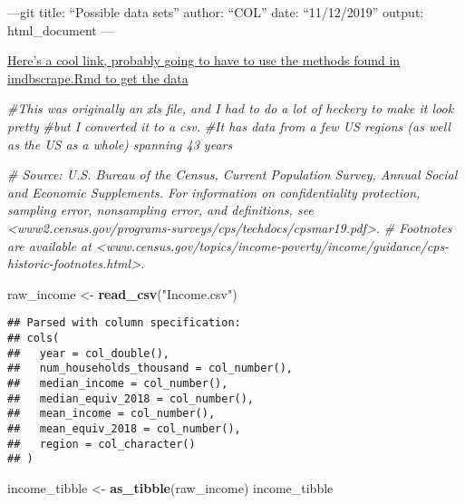 \documentclass[]{article}
\title{}
\author{}
\date{}
\newenvironment{Shaded}{\begin{snugshade}}{\end{snugshade}}
\newcommand{\CommentTok}[1]{\textcolor[rgb]{0.56,0.35,0.01}{\textit{#1}}}
\newcommand{\KeywordTok}[1]{\textcolor[rgb]{0.13,0.29,0.53}{\textbf{#1}}}
\newcommand{\NormalTok}[1]{#1}
\newcommand{\StringTok}[1]{\textcolor[rgb]{0.31,0.60,0.02}{#1}}
\begin{document}
---git title: ``Possible data sets'' author: ``COL'' date:
``11/12/2019'' output: html\_document ---

\href{https://inflationdata.com/Inflation/Consumer_Price_Index/HistoricalCPI.aspx?reloaded=true}{Here's
a cool link, probably going to have to use the methods found in
imdbscrape.Rmd to get the data}

\begin{Shaded}
\begin{Highlighting}[]
\CommentTok{#This was originally an xls file, and I had to do a lot of heckery to make it look pretty}
\CommentTok{#but I converted it to a csv.}
\CommentTok{#It has data from a few US regions (as well as the US as a whole) spanning 43 years}

\CommentTok{# Source: U.S. Bureau of the Census, Current Population Survey, Annual Social and Economic Supplements. For information on confidentiality protection, sampling error, nonsampling error, and definitions, see <www2.census.gov/programs-surveys/cps/techdocs/cpsmar19.pdf>.                    }
\CommentTok{# Footnotes are available at <www.census.gov/topics/income-poverty/income/guidance/cps-historic-footnotes.html>.                    }

\NormalTok{raw_income <-}\StringTok{ }\KeywordTok{read_csv}\NormalTok{(}\StringTok{"Income.csv"}\NormalTok{)}
\end{Highlighting}
\end{Shaded}

\begin{verbatim}
## Parsed with column specification:
## cols(
##   year = col_double(),
##   num_households_thousand = col_number(),
##   median_income = col_number(),
##   median_equiv_2018 = col_number(),
##   mean_income = col_number(),
##   mean_equiv_2018 = col_number(),
##   region = col_character()
## )
\end{verbatim}

\begin{Shaded}
\begin{Highlighting}[]
\NormalTok{income_tibble <-}\StringTok{ }\KeywordTok{as_tibble}\NormalTok{(raw_income)}
\NormalTok{income_tibble}
\end{Highlighting}
\end{Shaded}
\end{document}
